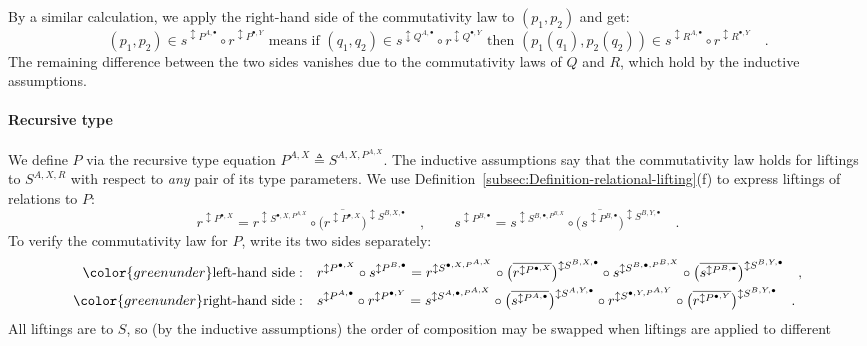 By a similar calculation, we apply the right-hand side of the commutativity
law to $\left(p_{1},p_{2}\right)$ and get:
\[
(p_{1},p_{2})\in s^{\updownarrow P^{A,\bullet}}\circ r^{\updownarrow P^{\bullet,Y}}\text{ means if }(q_{1},q_{2})\in s^{\updownarrow Q^{A,\bullet}}\circ r^{\updownarrow Q^{\bullet,Y}}\text{ then }(p_{1}(q_{1}),p_{2}(q_{2}))\in s^{\updownarrow R^{A,\bullet}}\circ r^{\updownarrow R^{\bullet,Y}}\quad.
\]
The remaining difference between the two sides vanishes due to the
commutativity laws of $Q$ and $R$, which hold by the inductive assumptions.

\paragraph{Recursive type}

We define $P$ via the recursive type equation $P^{A,X}\triangleq S^{A,X,P^{A,X}}$.
The inductive assumptions say that the commutativity law holds for
liftings to $S^{A,X,R}$ with respect to \emph{any} pair of its type
parameters. We use Definition~\ref{subsec:Definition-relational-lifting}(f)
to express liftings of relations to $P$:
\[
r^{\updownarrow P^{\bullet,X}}=r^{\updownarrow S^{\bullet,X,P^{A,X}}}\circ\big(\overline{r^{\updownarrow P^{\bullet,X}}}\big)^{\updownarrow S^{B,X,\bullet}}\quad,\quad\quad s^{\updownarrow P^{B,\bullet}}=s^{\updownarrow S^{B,\bullet,P^{B,X}}}\circ\big(\overline{s^{\updownarrow P^{B,\bullet}}}\big)^{\updownarrow S^{B,Y,\bullet}}\quad.
\]
To verify the commutativity law for $P$, write its two sides separately:
\begin{align*}
{\color{greenunder}\text{left-hand side}:}\quad & r^{\updownarrow P^{\bullet,X}}\circ s^{\updownarrow P^{B,\bullet}}=r^{\updownarrow S^{\bullet,X,P^{A,X}}}\circ\big(\overline{r^{\updownarrow P^{\bullet,X}}}\big)^{\updownarrow S^{B,X,\bullet}}\circ s^{\updownarrow S^{B,\bullet,P^{B,X}}}\circ\big(\overline{s^{\updownarrow P^{B,\bullet}}}\big)^{\updownarrow S^{B,Y,\bullet}}\quad,\\
{\color{greenunder}\text{right-hand side}:}\quad & s^{\updownarrow P^{A,\bullet}}\circ r^{\updownarrow P^{\bullet,Y}}=s^{\updownarrow S^{A,\bullet,P^{A,X}}}\circ\big(\overline{s^{\updownarrow P^{A,\bullet}}}\big)^{\updownarrow S^{A,Y,\bullet}}\circ r^{\updownarrow S^{\bullet,Y,P^{A,Y}}}\circ\big(\overline{r^{\updownarrow P^{\bullet,Y}}}\big)^{\updownarrow S^{B,Y,\bullet}}\quad.
\end{align*}
All liftings are to $S$, so (by the inductive assumptions) the order
of composition may be swapped when liftings are applied to different
